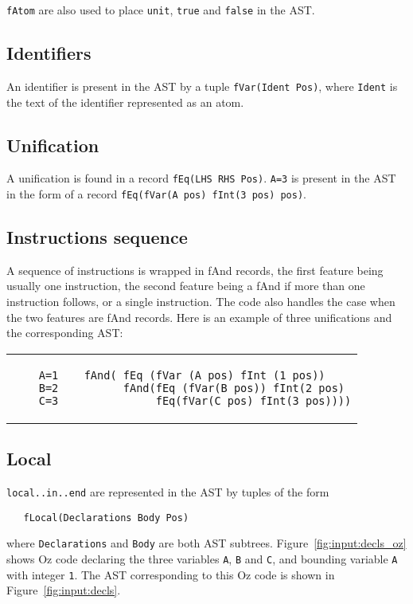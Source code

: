 \documentclass[a4paper]{memoir}
\begin{document}
\lstinline!fAtom! are also used to place \lstinline!unit!, \lstinline!true! and
\lstinline!false! in the AST.

\subsection{Identifiers}\label{sec:input:identifiers}
An identifier is present in the AST by a tuple \lstinline!fVar(Ident Pos)!,
where \lstinline!Ident! is the text of the identifier represented as an atom.

\subsection{Unification}
A unification is found in a record \lstinline!fEq(LHS RHS Pos)!.
\lstinline!A=3! is present in the AST in the form of a record
\lstinline!fEq(fVar(A pos) fInt(3 pos) pos)!.

\subsection{Instructions sequence}
A sequence of instructions is wrapped in fAnd records, the first feature being usually one instruction, the second feature being a fAnd if more than one instruction follows,  or a single instruction. The code also handles the case when the two features are fAnd records.
Here is an example of three unifications and the corresponding AST:\\
\begin{tabular}{ p{} p{} }
  \begin{lstlisting}
    A=1
    B=2
    C=3
  \end{lstlisting}
&
  \footnotesize{
  \begin{lstlisting}
  fAnd( fEq (fVar (A pos) fInt (1 pos))
        fAnd(fEq (fVar(B pos)) fInt(2 pos) 
             fEq(fVar(C pos) fInt(3 pos))))
  \end{lstlisting}
  }
\end{tabular}

\subsection{Local}\label{sec:input:flocal}
\lstinline!local..in..end! are represented in the AST by tuples of the form
\begin{lstlisting}
   fLocal(Declarations Body Pos)
\end{lstlisting}
where \lstinline!Declarations! and
\lstinline!Body! are both AST subtrees. 
Figure~\ref{fig:input:decls_oz} shows Oz code declaring the three variables
\lstinline!A!, \lstinline!B!
and \lstinline!C!, and bounding variable \lstinline!A! with integer
\lstinline!1!. The AST corresponding to this Oz code is shown in
Figure~\ref{fig:input:decls}.
\end{document}
